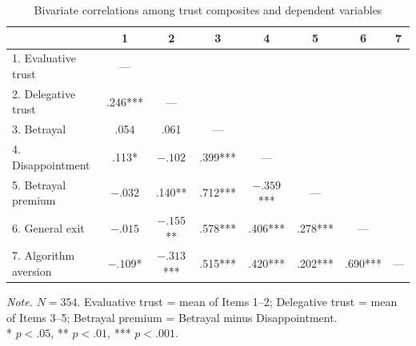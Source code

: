 \begin{table}[htbp]
\centering
\small
\caption{Bivariate correlations among trust composites and dependent variables}
\label{tab:correlations}
\begin{tabular}{lccccccc}
\toprule
 & 1 & 2 & 3 & 4 & 5 & 6 & 7 \\
\midrule
1. Evaluative trust  & ---    &        &        &        &        &        &     \\
2. Delegative trust  & .246*** & ---    &        &        &        &        &     \\
3. Betrayal          & .054   & .061   & ---    &        &        &        &     \\
4. Disappointment    & .113*  & $-.102$ & .399*** & ---    &        &        &     \\
5. Betrayal premium  & $-.032$ & .140** & .712*** & $-.359$*** & ---    &        &     \\
6. General exit      & $-.015$ & $-.155$** & .578*** & .406*** & .278*** & ---    &     \\
7. Algorithm aversion & $-.109$* & $-.313$*** & .515*** & .420*** & .202*** & .690*** & --- \\
\bottomrule
\end{tabular}
\begin{flushleft}
\footnotesize
\textit{Note.} $N = 354$. Evaluative trust = mean of Items 1--2; Delegative trust = mean of Items 3--5; Betrayal premium = Betrayal minus Disappointment. \\
* $p < .05$, ** $p < .01$, *** $p < .001$.
\end{flushleft}
\end{table}
